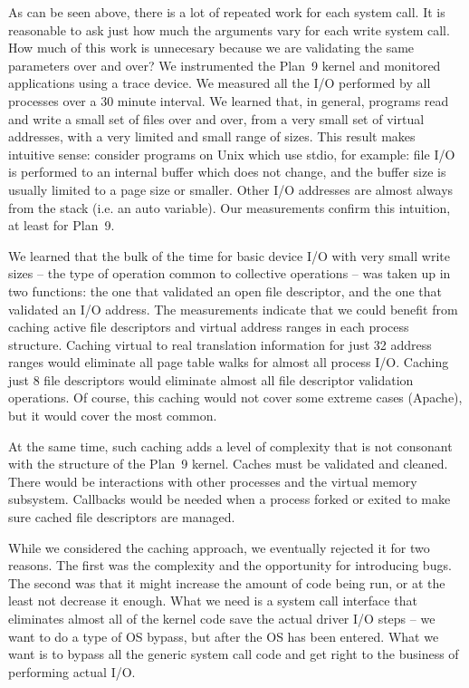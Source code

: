 \documentclass[letterpaper,twocolumn,10pt]{article}
\begin{document}
As can be seen above, there is a lot of repeated work for each system call. It is reasonable to ask just how much the arguments vary for each write system call. How much of this work is unnecesary because we are validating the same parameters over and over? 
We instrumented the Plan~9 kernel and monitored 
applications using  a trace device\cite{iwp9:tracedevice}. We measured all the I/O performed by all processes over 
a 30 minute interval. We learned that, in general, programs read and write a small 
set of files over and over, from a very small set of virtual addresses, with a very limited and small range of sizes. This result makes intuitive sense: consider programs on Unix which use stdio, for example: file I/O is performed 
to an internal buffer which does not change, and the buffer size is usually limited to a page size or smaller. Other I/O addresses are almost always from the stack (i.e. an auto variable). Our measurements confirm this intuition, at least for Plan~9. 

We learned that the bulk of the time for basic device I/O with very small write sizes -- the type of operation common to collective operations -- was taken up in two functions: the one that validated an open file descriptor, and the one that validated an I/O address. 
The measurements indicate that we could benefit from caching active file descriptors and virtual address ranges in each process structure. Caching virtual to real translation information for just 32 address ranges would eliminate all page table walks for almost all process I/O. Caching just 8 file descriptors would eliminate almost all file descriptor validation operations. Of course, this caching would not cover some extreme cases (Apache), but it would cover the most common. 


At the same time, such caching adds a level of complexity that is not consonant with the structure of the Plan~9 kernel. Caches must be validated and cleaned. There would be interactions with other processes and the virtual memory subsystem. Callbacks would be needed when a process forked or exited to make sure cached file descriptors are managed. 

While we considered the caching approach, we eventually rejected it for two reasons. The first was the complexity and the opportunity for introducing bugs. The second was that it might increase the amount of code being run, or at the least not decrease it enough. What we need is a system call interface that eliminates almost all of the kernel code save the actual driver I/O steps -- we want to do a type of OS bypass, but after the OS has been entered. What we want is to bypass all the generic system call code and get right to the business of performing actual I/O. 
\end{document}
